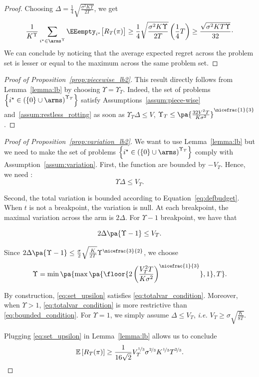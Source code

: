 \begin{proof}
Choosing $\Delta = \frac{1}{4}\sqrt{\frac{\sigma^2K\Upsilon}{2T}}$, we get 
\[
 \frac{1}{K^{\Upsilon}} \sum_{i^\star\in \arms^{\Upsilon}}  \EEempty_{i^\star}\big[R_T(\pi)\big]  \geq  \frac{1}{4}\sqrt{\frac{\sigma^2K\Upsilon}{2T}}\left(\frac{1}{4}T\right) \geq \frac{\sqrt{\sigma^2KT\Upsilon}}{32}\cdot
\]
We can conclude by noticing that the average expected regret across the problem set is lesser or equal to the maximum across the same problem set.
\end{proof}

\begin{proof}[Proof of Proposition~\ref{prop:piecewise_lb2}]
This result directly follows from Lemma~\ref{lemma:lb} by choosing $\Upsilon = \Upsilon_T$. Indeed, the set of problems $\left\{i^\star \in \left(\left\{0\right\} \cup \arms\right)^{\Upsilon_T} \right\}$ satisfy Assumptions~\ref{assum:piece-wise} and~\ref{assum:restless_rotting} as soon as $\Upsilon_T\Delta \leq V$, \ie $\Upsilon_T \leq \pa{\frac{32V^2T }{K\sigma^2}}^{\nicefrac{1}{3}}$.
\end{proof}


\begin{proof}[Proof of Proposition~\ref{prop:variation_lb2}]
\sloppy
We want to use Lemma~\ref{lemma:lb} but we need to make the set of problems $\left\{i^\star \in \left(\left\{0\right\} \cup \arms\right)^{\Upsilon_T} \right\}$ comply with Assumption~\ref{assum:variation}. First, the function are bounded by $-V_T$. Hence, we need : 
\begin{equation}
\label{eq:bounded_condition}
  \Upsilon \Delta \leq V_T.  
\end{equation}

Second, the total variation is bounded according to Equation~\ref{eq:defbudget}. When $t$ is not a breakpoint, the variation is null. At each breakpoint, the maximal variation across the arm is $2\Delta$. For $\Upsilon-1$ breakpoint, we have that 


\begin{equation}
\label{eq:totalvar_condition}
  2\Delta \pa{\Upsilon-1}  \leq V_T.  
\end{equation}

Since $ 2\Delta \pa{\Upsilon-1} \leq \frac{\sigma}{2}\sqrt{\frac{K}{2T}}\Upsilon^{\nicefrac{3}{2}} $, we choose 
\begin{equation}
\label{eq:set_upsilon}
\Upsilon = \min\pa{\max\pa{\floor{ 2\left(\frac{V_T^{2}T}{K\sigma^{2}}\right)^{\nicefrac{1}{3}}},1},T}.
\end{equation}

By construction, \ref{eq:set_upsilon} satisfies \ref{eq:totalvar_condition}. Moreover, when $\Upsilon >1$, \ref{eq:totalvar_condition} is more restrictive than \ref{eq:bounded_condition}. For $\Upsilon = 1$, we simply assume $\Delta \leq V_T$, \textit{i.e.} $V_{T} \geq \sigma \sqrt{\frac{K}{8 T}}$.

Plugging \ref{eq:set_upsilon} in Lemma~\ref{lemma:lb} allows us to conclude 
\[
    \mathbb{E}\left[R_T(\pi)\right] \geq \frac{1}{16\sqrt{2}} V_T^{\nicefrac{1}{3}}\sigma^{\nicefrac{2}{3}}K^{\nicefrac{1}{3}}T^{\nicefrac{2}{3}}.
\]
\end{proof}